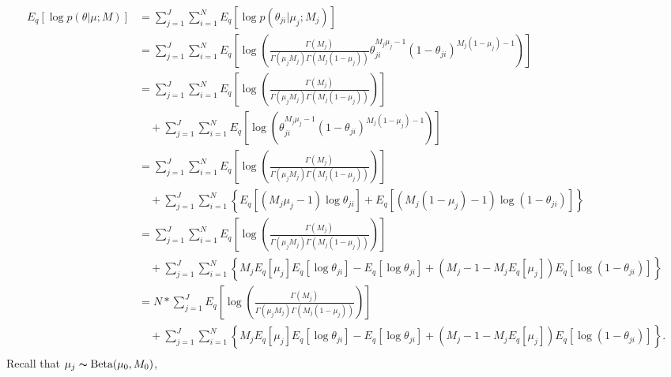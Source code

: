 \documentclass[11pt,reqno]{amsart}
\begin{document}
\begin{equation}
\begin{split}
\label{theta}
E_q \left[ \log p\left(\theta | \mu; M \right)\right] &= \sum_{j=1}^{J} \sum_{i=1}^{N} E_q \left[ \log p\left(\theta_{ji} | \mu_j; M_j \right)\right] \\
&= \sum_{j=1}^{J} \sum_{i=1}^{N}  E_q  \left[ \log \left( \frac{ \Gamma(M_j) } { \Gamma(\mu_j M_j) \Gamma(M_j (1-\mu_j)) } \theta_{ji}^{M_j\mu_j -1} (1 - \theta_{ji})^{M_j ( 1 - \mu_j) - 1} \right) \right] \\
&= \sum_{j=1}^{J} \sum_{i=1}^{N} E_q  \left[ \log \left( \frac{ \Gamma(M_j) } { \Gamma(\mu_j M_j) \Gamma(M_j (1-\mu_j)) }\right) \right] \\
&\quad + \sum_{j=1}^{J} \sum_{i=1}^{N}  E_q  \left[ \log \left( \theta_{ji}^{M_j\mu_j -1} (1 - \theta_{ji})^{M_j ( 1 - \mu_j) - 1} \right) \right] \\
&= \sum_{j=1}^{J} \sum_{i=1}^{N} E_q  \left[ \log \left( \frac{ \Gamma(M_j) } { \Gamma(\mu_j M_j) \Gamma(M_j (1-\mu_j)) }\right) \right]  \\
&\quad + \sum_{j=1}^{J} \sum_{i=1}^{N} \left\lbrace E_q \left[ \left( M_j\mu_j -1 \right) \log \theta_{ji} \right] + E_q \left[ \left( M_j ( 1 - \mu_j) - 1 \right) \log \left( 1 - \theta_{ji} \right) \right]\right\rbrace \\
&= \sum_{j=1}^{J} \sum_{i=1}^{N} E_q  \left[ \log \left( \frac{ \Gamma(M_j) } { \Gamma(\mu_j M_j) \Gamma(M_j (1-\mu_j)) }\right) \right] \\
&\quad + \sum_{j=1}^{J} \sum_{i=1}^{N} \left\lbrace M_j E_q \left[ \mu_j \right] E_q \left[ \log \theta_{ji} \right] - E_q  \left[ \log \theta_{ji} \right] + \left( M_j - 1 - M_j E_q\left[ \mu_j \right]  \right) E_q\left[ \log \left( 1 - \theta_{ji}\right) \right] \right\rbrace \\
&= N* \sum_{j=1}^{J} E_q  \left[ \log \left( \frac{ \Gamma(M_j) } { \Gamma(\mu_j M_j) \Gamma(M_j (1-\mu_j)) }\right) \right] \\
&\quad + \sum_{j=1}^{J} \sum_{i=1}^{N} \left\lbrace M_j E_q \left[ \mu_j \right] E_q \left[ \log \theta_{ji} \right] - E_q  \left[ \log \theta_{ji} \right] + \left( M_j - 1 - M_j E_q\left[ \mu_j \right]  \right) E_q\left[ \log \left( 1 - \theta_{ji}\right) \right] \right\rbrace. \\
\end{split}
\end{equation}
Recall that $\mu_j \thicksim \text{Beta}(\mu_0, M_0)$,
\end{document}
